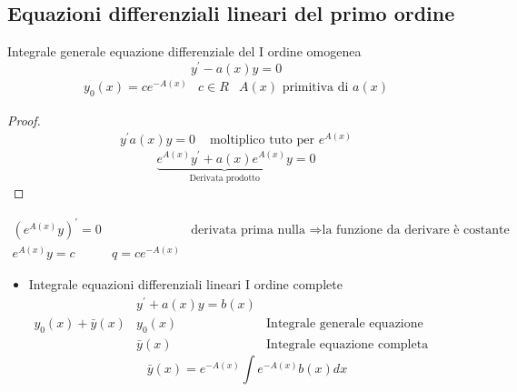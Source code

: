 \subsection{Equazioni differenziali lineari del primo ordine}
Integrale generale equazione differenziale del I ordine omogenea
\begin{equation*}
	y^\prime-a(x)y=0
\end{equation*}
\begin{eqnarray*}
	y_0(x)=ce^{-A(x)}&c\in R & A(x)\text{ primitiva di } a(x)
\end{eqnarray*}
\begin{proof}
	\begin{eqnarray*}
		y^\prime a(x)y=0 &\text{ moltiplico tuto per } e^{A(x)}
	\end{eqnarray*}
	\begin{equation*}
		\underbrace{e^{A(x)}y^\prime+a(x)e^{A(x)}y}_{\text{Derivata
		prodotto}}=0
	\end{equation*}
\end{proof}
\begin{eqnarray*}
	(e^{A(x)}y)^\prime=0 && \text{derivata prima nulla } \Rightarrow \text{la
	funzione da derivare è costante}\\
	e^{A(x)}y=c & q=ce^{-A(x)}
\end{eqnarray*}
\begin{itemize}
	\item Integrale equazioni differenziali lineari I ordine complete
		\begin{eqnarray*}
			&y^\prime+a(x)y=b(x)\\
			y_0(x)+\bar{y}(x) & y_0(x) & \text{Integrale generale equazione
			differenziale omogenea associata}\\
			&\bar{y}(x) &\text{Integrale equazione completa}
		\end{eqnarray*}
		\begin{equation*}
			\bar{y}(x)=e^{-A(x)}\int e^{-A(x)}b(x)dx
		\end{equation*}
\end{itemize}
\clearpage
